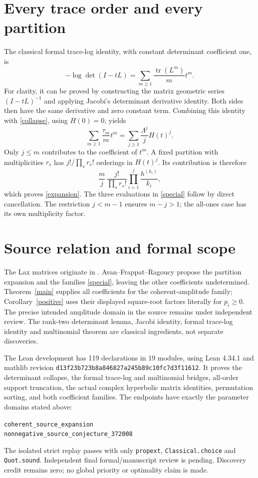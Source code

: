 \documentclass[11pt]{article}
\begin{document}
\section*{Every trace order and every partition}
The classical formal trace-log identity, with constant determinant coefficient one, is
\[
 -\log\det(I-tL)=\sum_{m\geq1}\frac{\operatorname{tr}(L^m)}m t^m.
\]
For clarity, it can be proved by constructing the matrix geometric series $(I-tL)^{-1}$ and applying Jacobi's determinant derivative identity. Both sides then have the same derivative and zero constant term. Combining this identity with \eqref{collapse}, using $H(0)=0$, yields
\begin{equation}\label{log}
 \sum_{m\geq1}\frac{\tau_m}m t^m
   =\sum_{j\geq1}\frac{\Lambda^j}{j}H(t)^j.
\end{equation}
Only $j\leq m$ contributes to the coefficient of $t^m$. A fixed partition with multiplicities $r_s$ has $j!/\prod_s r_s!$ orderings in $H(t)^j$. Its contribution is therefore
\[
 \frac mj\,\frac{j!}{\prod_s r_s!}\prod_{i=1}^j\frac{h^{(k_i)}}{k_i},
\]
which proves \eqref{expansion}. The three evaluations in \eqref{special} follow by direct cancellation. The restriction $j<m-1$ ensures $m-j>1$; the all-ones case has its own multiplicity factor.

\section*{Source relation and formal scope}
The Lax matrices originate in \cite{RB,AFR2023}. Avan--Frappat--Ragoucy \cite[Conjecture~5.2, eqs.~(5.20)--(5.21)]{AFR} propose the partition expansion and the families \eqref{special}, leaving the other coefficients undetermined. Theorem~\ref{main} supplies all coefficients for the coherent-amplitude family; Corollary~\ref{positive} uses their displayed square-root factors literally for $p_i\geq0$. The precise intended amplitude domain in the source remains under independent review. The rank-two determinant lemma, Jacobi identity, formal trace-log identity and multinomial theorem are classical ingredients, not separate discoveries.

The Lean development has 119 declarations in 19 modules, using Lean 4.34.1 and mathlib revision\newline
\texttt{d13f23b723b8a846827a245b89c10fc7d3f11612}. It proves the determinant collapse, the formal trace-log and multinomial bridges, all-order support truncation, the actual complex hyperbolic matrix identities, permutation sorting, and both coefficient families. The endpoints have exactly the parameter domains stated above:
\begin{center}\small\texttt{coherent\_source\_expansion}\\\texttt{nonnegative\_source\_conjecture\_372008}\end{center}
The isolated strict replay passes with only \texttt{propext}, \texttt{Classical.choice} and \texttt{Quot.sound}. Independent final formal/manuscript review is pending. Discovery credit remains zero; no global priority or optimality claim is made.
\end{document}
